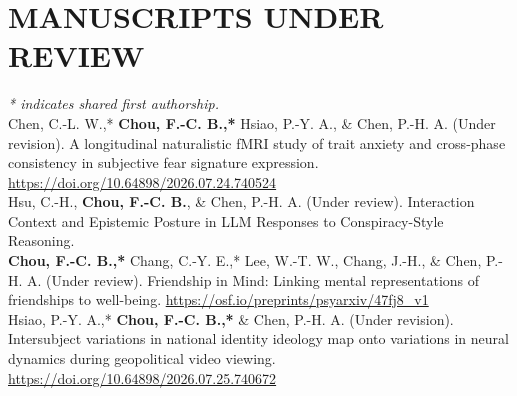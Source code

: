 \documentclass[a4paper,12pt]{article}
\newcommand{\sectionspace}{0pt} %
\newcommand{\itemspace}{7pt} %
\begin{document}
\section*{MANUSCRIPTS UNDER REVIEW}
\textit{* indicates shared first authorship.} \\[6pt]
\noindent Chen, C.-L. W.,* \textbf{Chou, F.-C. B.,*} Hsiao, P.-Y. A., \& Chen, P.-H. A. (Under revision). A longitudinal naturalistic fMRI study of trait anxiety and cross-phase consistency in subjective fear signature expression. \href{https://doi.org/10.64898/2026.07.24.740524}{https://doi.org/10.64898/2026.07.24.740524}\\[\itemspace]
\noindent Hsu, C.-H., \textbf{Chou, F.-C. B.}, \& Chen, P.-H. A. (Under review). Interaction Context and Epistemic Posture in LLM Responses to Conspiracy-Style Reasoning.\\[\itemspace]
\noindent \textbf{Chou, F.-C. B.,*} Chang, C.-Y. E.,* Lee, W.-T. W., Chang, J.-H., \& Chen, P.-H. A. (Under review). Friendship in Mind: Linking mental representations of friendships to well-being. \href{https://osf.io/preprints/psyarxiv/47fj8_v1}{https://osf.io/preprints/psyarxiv/47fj8\_v1}\\[\itemspace]
\noindent Hsiao, P.-Y. A.,* \textbf{Chou, F.-C. B.,*} \& Chen, P.-H. A. (Under revision). Intersubject variations in national identity ideology map onto variations in neural dynamics during geopolitical video viewing. \href{https://doi.org/10.64898/2026.07.25.740672}{https://doi.org/10.64898/2026.07.25.740672}\\[\itemspace]

\vspace{\sectionspace}
\end{document}
